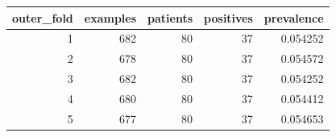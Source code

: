 \begin{tabular}{rrrrr}
\toprule
outer\_fold & examples & patients & positives & prevalence \\
\midrule
1 & 682 & 80 & 37 & 0.054252 \\
2 & 678 & 80 & 37 & 0.054572 \\
3 & 682 & 80 & 37 & 0.054252 \\
4 & 680 & 80 & 37 & 0.054412 \\
5 & 677 & 80 & 37 & 0.054653 \\
\bottomrule
\end{tabular}
